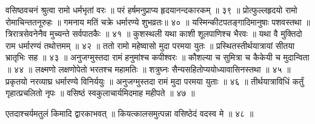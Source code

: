 वसिष्ठवचनं श्रुत्वा रामो धर्मभृतां वरः ॥
परं हर्षमनुप्राप्य हृदयानन्दकारकम् ॥ ३९ ॥
प्रोत्फुल्लहृदयो रामो रोमाचिन्ततनूरुहः ॥
गमनाय मतिं चक्रे धर्मारण्ये शुभव्रतः॥ ४० ॥
यस्मिन्कीटपतङ्गादिमानुषाः पशवस्तथा ॥
त्रिरात्रसेवनेनैव मुच्यन्ते सर्वपातकैः ॥ ४१ ॥
कुशस्थली यथा काशी शूलपाणिश्च भैरवः ॥
यथा वै मुक्तिदो राम धर्मारण्यं तथोत्तमम् ॥ ४२ ॥
ततो रामो महेष्वासो मुदा परमया युतः ॥
प्रस्थितस्तीर्थयात्रायां सीतया भ्रातृभिः सह ॥ ४३ ॥
अनुजग्मुस्तदा रामं हनुमांश्च कपीश्वरः ॥
कौशल्या च सुमित्रा च कैकेयी च मुदान्विता ॥ ४४ ॥
लक्ष्मणो लक्षणोपेतो भरतश्च महामतिः ॥
शत्रुघ्नः सैन्यसहितोप्ययोध्यावासिनस्तथा ॥ ४५ ॥
प्रकृतयो नरव्याघ्र धर्मारण्ये विनिर्ययुः ॥
अनुजग्मुस्तदा रामं मुदा परमया युताः ॥ ४६ ॥
तीर्थयात्राविधिं कर्तुं गृहात्प्रचलितो नृपः ॥
वसिष्ठं स्वकुलाचार्यमिदमाह महीपते ॥ ४७ ॥

एतदाश्चर्यमतुलं किमादि द्वारकाभवत् ॥
कियत्कालसमुत्पन्ना वसिष्ठेदं वदस्व मे ॥ ४८ ॥

